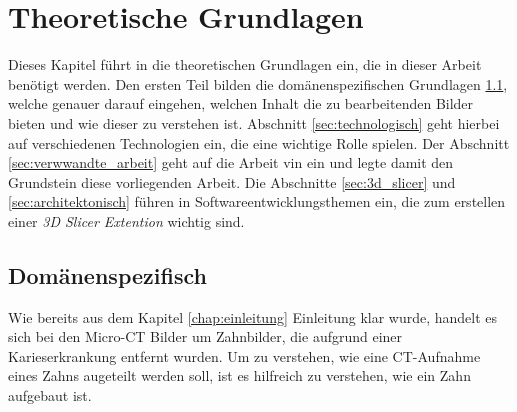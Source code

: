 \chapter{Theoretische Grundlagen}
\label{chap:theoretische_grundlagen} Dieses Kapitel führt in die theoretischen Grundlagen
ein, die in dieser Arbeit benötigt werden. Den ersten Teil bilden die domänenspezifischen
Grundlagen \ref{sec:domänenspezifisch}, welche genauer darauf eingehen, welchen Inhalt
die zu bearbeitenden Bilder bieten und wie dieser zu verstehen ist. Abschnitt
\ref{sec:technologisch} geht hierbei auf verschiedenen Technologien ein, die eine
wichtige Rolle spielen. Der Abschnitt \ref{sec:verwwandte_arbeit} geht auf die
Arbeit vin \citet{hoffmann2020} ein und legte damit den Grundstein diese vorliegenden
Arbeit. Die Abschnitte \ref{sec:3d_slicer} und \ref{sec:architektonisch} führen
in Softwareentwicklungsthemen ein, die zum erstellen einer \textit{3D Slicer
Extention} wichtig sind.

\section{Domänenspezifisch}
\label{sec:domänenspezifisch} Wie bereits aus dem Kapitel \ref{chap:einleitung}
Einleitung klar wurde, handelt es sich bei den Micro-CT Bilder um Zahnbilder,
die aufgrund einer Karieserkrankung entfernt wurden. Um zu verstehen, wie eine
CT-Aufnahme eines Zahns augeteilt werden soll, ist es hilfreich zu verstehen,
wie ein Zahn aufgebaut ist.

